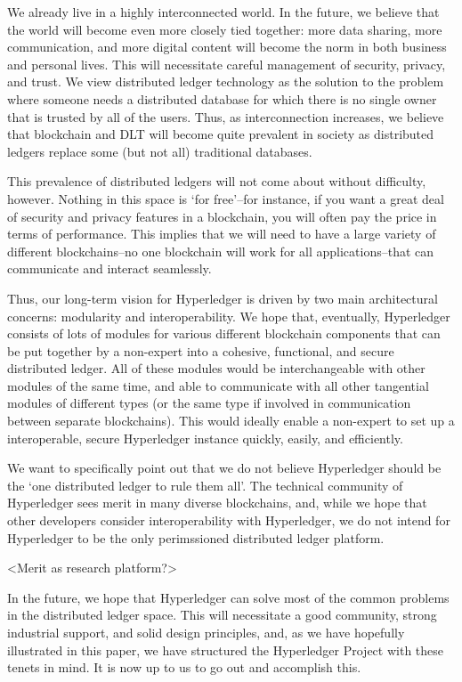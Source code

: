 We already live in a highly interconnected world.  In the future, we believe that the world will become even more closely tied together:  more data sharing, more communication, and more digital content will become the norm in both business and personal lives.  This will necessitate careful management of security, privacy, and trust.  We view distributed ledger technology as the solution to the problem where someone needs a distributed database for which there is no single owner that is trusted by all of the users.  Thus, as interconnection increases, we believe that blockchain and DLT will become quite prevalent in society as distributed ledgers replace some (but not all) traditional databases.

This prevalence of distributed ledgers will not come about without difficulty, however.  Nothing in this space is `for free'--for instance, if you want a great deal of security and privacy features in a blockchain, you will often pay the price in terms of performance.  This implies that we will need to have a large variety of different blockchains--no one blockchain will work for all applications--that can communicate and interact seamlessly.

Thus, our long-term vision for Hyperledger is driven by two main architectural concerns:  modularity and interoperability.  We hope that, eventually, Hyperledger consists of lots of modules for various different blockchain components that can be put together by a non-expert into a cohesive, functional, and secure distributed ledger.  All of these modules would be interchangeable with other modules of the same time, and able to communicate with all other tangential modules of different types (or the same type if involved in communication between separate blockchains).  This would ideally enable a non-expert to set up a interoperable, secure Hyperledger instance quickly, easily, and efficiently.  

We want to specifically point out that we do not believe Hyperledger should be the `one distributed ledger to rule them all'.  The technical community of Hyperledger sees merit in many diverse blockchains, and, while we hope that other developers consider interoperability with Hyperledger, we do not intend for Hyperledger to be the only perimssioned distributed ledger platform.

<Merit as research platform?>

In the future, we hope that Hyperledger can solve most of the common problems in the distributed ledger space.  This will necessitate a good community, strong industrial support, and solid design principles, and, as we have hopefully illustrated in this paper, we have structured the Hyperledger Project with these tenets in mind.  It is now up to us to go out and accomplish this.